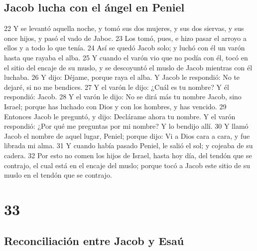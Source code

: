 \section{Jacob lucha con el ángel en Peniel}

22 Y se levantó aquella noche, y tomó sus dos mujeres, y sus dos siervas, y sus once hijos, y pasó el vado de Jaboc.
23 Los tomó, pues, e hizo pasar el arroyo a ellos y a todo lo que tenía.
24 Así se quedó Jacob solo; y luchó con él un varón hasta que rayaba el alba.
25 Y cuando el varón vio que no podía con él, tocó en el sitio del encaje de su muslo, y se descoyuntó el muslo de Jacob mientras con él luchaba.
26 Y dijo: Déjame, porque raya el alba. Y Jacob le respondió: No te dejaré, si no me bendices.
27 Y el varón le dijo: ¿Cuál es tu nombre? Y él respondió: Jacob.
28 Y el varón le dijo: No se dirá más tu nombre Jacob, sino Israel; porque has luchado con Dios y con los hombres, y has vencido.
29 Entonces Jacob le preguntó, y dijo: Declárame ahora tu nombre. Y el varón respondió: ¿Por qué me preguntas por mi nombre? Y lo bendijo allí.
30 Y llamó Jacob el nombre de aquel lugar, Peniel; porque dijo: Vi a Dios cara a cara, y fue librada mi alma.
31 Y cuando había pasado Peniel, le salió el sol; y cojeaba de su cadera.
32 Por esto no comen los hijos de Israel, hasta hoy día, del tendón que se contrajo, el cual está en el encaje del muslo; porque tocó a Jacob este sitio de su muslo en el tendón que se contrajo.

\chapter{33}

\section{Reconciliación entre Jacob y Esaú}

